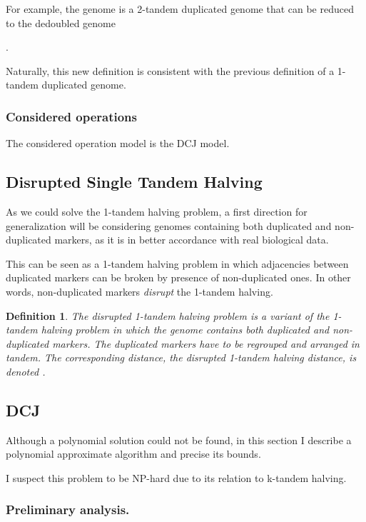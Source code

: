 \documentclass[11pt,final,twoside,nofrench]{thlifl}
\newtheorem{definition}{Definition}
\begin{document}
{For example, the genome
 is a 2-tandem
duplicated genome that can be reduced to the dedoubled genome 

.

Naturally, this new definition is consistent with the previous definition of a 1-tandem duplicated genome.

\subsubsection{Considered operations}

The considered operation model is the DCJ model.

\subsection{Disrupted Single Tandem Halving}
\label{sec:disrupted}

As we could solve the 1-tandem halving problem, a first direction for generalization will be considering genomes containing both duplicated and non-duplicated markers, as it is in better accordance with real biological data.

This can be seen as a 1-tandem halving problem in which adjacencies between duplicated markers can be broken by presence of non-duplicated ones. In other words, non-duplicated markers \emph{disrupt} the 1-tandem halving.

\begin{definition}
The \emph{disrupted 1-tandem halving problem} is a variant of the 1-tandem halving problem in which the genome contains both duplicated and non-duplicated markers. The duplicated markers have to be regrouped and arranged in tandem. The corresponding distance, the \emph{disrupted 1-tandem halving distance}, is denoted .
\end{definition}

\subsection{DCJ}

Although a polynomial solution could not be found, in this section I describe a polynomial approximate algorithm and precise its bounds.

I suspect this problem to be NP-hard due to its relation to k-tandem halving.

\subsubsection{Preliminary analysis.}

}
\end{document}
